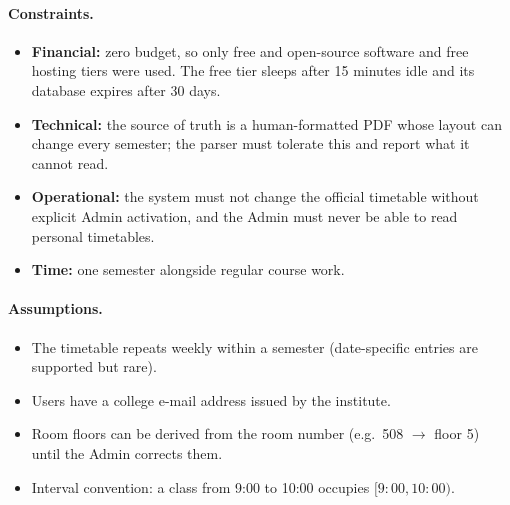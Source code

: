 \paragraph{Constraints.}
\begin{itemize}
\item \textbf{Financial:} zero budget, so only free and open-source software and free hosting tiers were used.
      The free tier sleeps after 15 minutes idle and its database expires after 30 days.
\item \textbf{Technical:} the source of truth is a human-formatted PDF whose layout can change every
      semester; the parser must tolerate this and report what it cannot read.
\item \textbf{Operational:} the system must not change the official timetable without explicit Admin
      activation, and the Admin must never be able to read personal timetables.
\item \textbf{Time:} one semester alongside regular course work.
\end{itemize}
\paragraph{Assumptions.}
\begin{itemize}
\item The timetable repeats weekly within a semester (date-specific entries are supported but rare).
\item Users have a college e-mail address issued by the institute.
\item Room floors can be derived from the room number (e.g.\ 508 $\rightarrow$ floor 5) until the
      Admin corrects them.
\item Interval convention: a class from 9:00 to 10:00 occupies $[9{:}00, 10{:}00)$.
\end{itemize}

